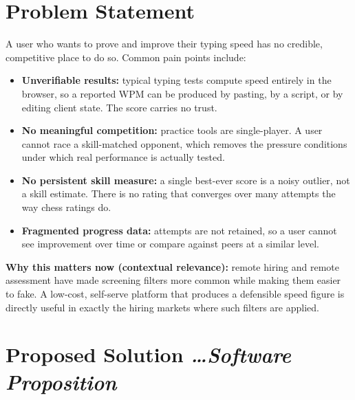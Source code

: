 \documentclass[11pt,a4paper]{article}
\newcommand{\BvrHint}[1]{%
  {\normalfont\normalsize\itshape\hfill #1}}
\begin{document}
\section{Problem Statement}
A user who wants to prove and improve their typing speed has no
credible, competitive place to do so. Common pain points include:
\begin{itemize}[leftmargin=0.7cm]
    \item \textbf{Unverifiable results:} typical typing tests compute speed entirely in the browser, so a reported WPM can be produced by pasting, by a script, or by editing client state. The score carries no trust.
    \item \textbf{No meaningful competition:} practice tools are single-player. A user cannot race a skill-matched opponent, which removes the pressure conditions under which real performance is actually tested.
    \item \textbf{No persistent skill measure:} a single best-ever score is a noisy outlier, not a skill estimate. There is no rating that converges over many attempts the way chess ratings do.
    \item \textbf{Fragmented progress data:} attempts are not retained, so a user cannot see improvement over time or compare against peers at a similar level.
\end{itemize}

\textbf{Why this matters now (contextual relevance):} remote
hiring and remote assessment have made screening filters more
common while making them easier to fake. A low-cost, self-serve
platform that produces a defensible speed figure is directly
useful in exactly the hiring markets where such filters are
applied.

\section{Proposed Solution %
\BvrHint{\ldots Software Proposition}}
\end{document}
